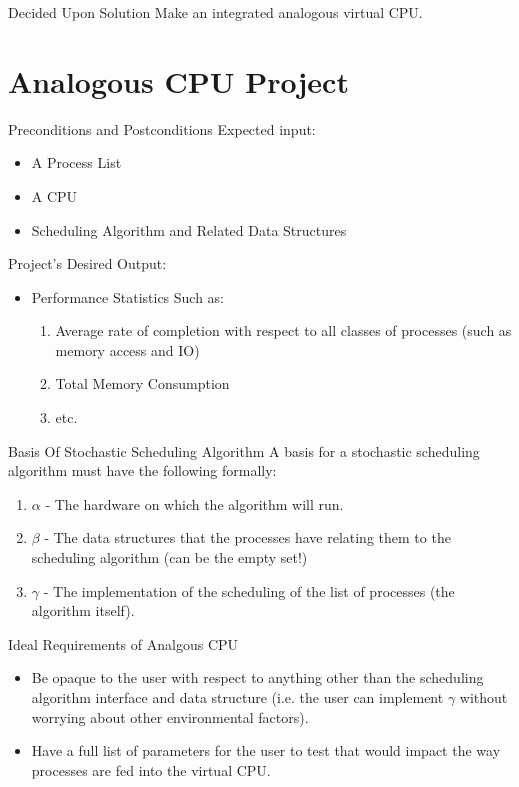 \documentclass{beamer}
\begin{document}
  \begin{frame}{Decided Upon Solution}
    Make an integrated analogous virtual CPU.
  \end{frame}

\section{Analogous CPU Project}
  \begin{frame}{Preconditions and Postconditions}
    Expected input:
    \begin{itemize}
      \item A Process List
      \item A CPU
      \item Scheduling Algorithm and Related Data Structures
    \end{itemize}
    Project's Desired Output:
    \begin{itemize}
      \item Performance Statistics Such as:
        \begin{enumerate}
          \item Average rate of completion with respect to all classes of
            processes (such as memory access and IO)
          \item Total Memory Consumption
          \item etc.
        \end{enumerate}
    \end{itemize}
  \end{frame}

  \begin{frame}{Basis Of Stochastic Scheduling Algorithm}
    A basis for a stochastic scheduling algorithm must have the following
    formally:
    \begin{enumerate}
      \item $\alpha$ - The hardware on which the algorithm will run.
      \item $\beta$ - The data structures that the processes have relating them
        to the scheduling algorithm (can be the empty set!)
      \item $\gamma$ - The implementation of the scheduling of the list of
        processes (the algorithm itself).
    \end{enumerate}
  \end{frame}

  \begin{frame}{Ideal Requirements of Analgous CPU}
    \begin{itemize}
      \item Be opaque to the user with respect to anything other than the scheduling
        algorithm interface and data structure (i.e. the user can implement
        $\gamma$ without worrying about other environmental factors).
      \item Have a full list of parameters for the user to test that would
        impact the way processes are fed into the virtual CPU.
    \end{itemize}
  \end{frame}
\end{document}
